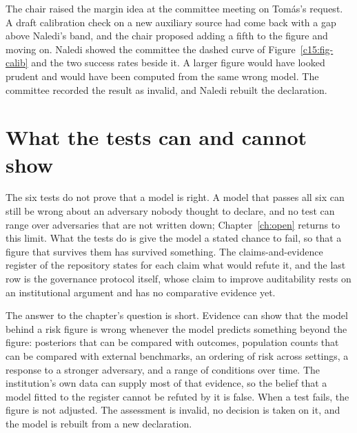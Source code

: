 The chair raised the margin idea at the committee meeting on Tomás's request. A
draft calibration check on a new auxiliary source had come back with a gap above
Naledi's band, and the chair proposed adding a fifth to the figure and moving on.
Naledi showed the committee the dashed curve of Figure~\ref{c15:fig-calib} and the
two success rates beside it. A larger figure would have looked prudent and would
have been computed from the same wrong model. The committee recorded the result as
invalid, and Naledi rebuilt the declaration.

\section{What the tests can and cannot show}

The six tests do not prove that a model is right. A model that passes all six can
still be wrong about an adversary nobody thought to declare, and no test can range
over adversaries that are not written down; Chapter~\ref{ch:open} returns to this
limit. What the tests do is give the model a stated chance to fail, so that a
figure that survives them has survived something. The claims-and-evidence register
of the repository states for each claim what would refute it, and the last row is
the governance protocol itself, whose claim to improve auditability rests on an
institutional argument and has no comparative evidence yet.

The answer to the chapter's question is short. Evidence can show that the model
behind a risk figure is wrong whenever the model predicts something beyond the
figure: posteriors that can be compared with outcomes, population counts that can
be compared with external benchmarks, an ordering of risk across settings, a
response to a stronger adversary, and a range of conditions over time. The
institution's own data can supply most of that evidence, so the belief that a model
fitted to the register cannot be refuted by it is false. When a test fails, the
figure is not adjusted. The assessment is invalid, no decision is taken on it, and
the model is rebuilt from a new declaration.

